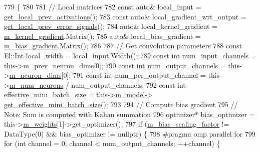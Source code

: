 \begin{DoxyCode}
779                                                                    \{
780 
781     \textcolor{comment}{// Local matrices}
782     \textcolor{keyword}{const} \textcolor{keyword}{auto}& local\_input = \hyperlink{classlbann_1_1Layer_a35397843bb0c84030000c7d872229acb}{get\_local\_prev\_activations}();
783     \textcolor{keyword}{const} \textcolor{keyword}{auto}& local\_gradient\_wrt\_output = \hyperlink{classlbann_1_1Layer_a82827edc5e869960144f3ccb2172bfcd}{get\_local\_prev\_error\_signals}();
784     \textcolor{keyword}{auto}& local\_kernel\_gradient = \hyperlink{classlbann_1_1base__convolution__layer_a4129f11df61ed92bcad24ae855d7bd11}{m\_kernel\_gradient}.Matrix();
785     \textcolor{keyword}{auto}& local\_bias\_gradient = \hyperlink{classlbann_1_1base__convolution__layer_a2ee1db4a1a74f167e3472d5ed7075179}{m\_bias\_gradient}.Matrix();
786     
787     \textcolor{comment}{// Get convolution parameters}
788     \textcolor{keyword}{const} El::Int local\_width = local\_input.Width();
789     \textcolor{keyword}{const} \textcolor{keywordtype}{int} num\_input\_channels = this->\hyperlink{classlbann_1_1Layer_ae204d1a2a79606eaa117273857ff62a3}{m\_prev\_neuron\_dims}[0];
790     \textcolor{keyword}{const} \textcolor{keywordtype}{int} num\_output\_channels = this->\hyperlink{classlbann_1_1Layer_abb34bb8031f57a483e2e327a5f229f48}{m\_neuron\_dims}[0];
791     \textcolor{keyword}{const} \textcolor{keywordtype}{int} num\_per\_output\_channel = this->\hyperlink{classlbann_1_1Layer_a6b5ebc8a7d9329d8a773ed787e7b41d8}{m\_num\_neurons} / num\_output\_channels;
792     \textcolor{keyword}{const} \textcolor{keywordtype}{int} effective\_mini\_batch\_size = this->\hyperlink{classlbann_1_1Layer_a3d9315e99574166f2f33e37b572021d2}{m\_model}->
      \hyperlink{classlbann_1_1model_a2a9b4cfa1c8c91e4131908751f9c4a6a}{get\_effective\_mini\_batch\_size}();
793 
794     \textcolor{comment}{// Compute bias gradient}
795     \textcolor{comment}{// Note: Sum is computed with Kahan summation}
796     optimizer* bias\_optimizer = this->\hyperlink{classlbann_1_1Layer_a7954e30fbf9100a6ba4b56d02767a469}{m\_weights}[1]->get\_optimizer();
797     \textcolor{keywordflow}{if} (\hyperlink{classlbann_1_1base__convolution__layer_a5abe0bcd128b66a41fa481b28a9c2104}{m\_bias\_scaling\_factor} != DataType(0) && bias\_optimizer != \textcolor{keyword}{nullptr}) \{
798 \textcolor{preprocessor}{      #pragma omp parallel for}
799       \textcolor{keywordflow}{for} (\textcolor{keywordtype}{int} channel = 0; channel < num\_output\_channels; ++channel) \{

\end{DoxyCode}
